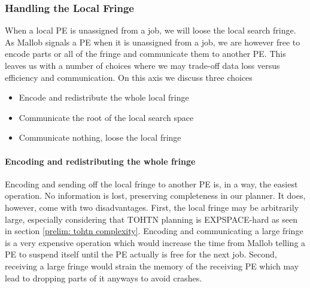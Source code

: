 \subsubsection{Handling the Local Fringe}
When a local PE is unassigned from a job, we will loose the local search fringe. As Mallob signals a PE when it is unassigned from a job, we are however free to encode parts or all of the fringe and communicate them to another PE. This leaves us with a number of choices where we may trade-off data loss versus efficiency and communication. On this axis we discuss three choices
\begin{itemize}
	\item Encode and redistribute the whole local fringe
	\item Communicate the root of the local search space
	\item Communicate nothing, loose the local fringe
\end{itemize}

\paragraph{Encoding and redistributing the whole fringe}
Encoding and sending off the local fringe to another PE is, in a way, the easiest operation. No information is lost, preserving completeness in our planner. It does, however, come with two disadvantages. First, the local fringe may be arbitrarily large, especially considering that TOHTN planning is EXPSPACE-hard as seen in section \ref{prelim: tohtn complexity}. Encoding and communicating a large fringe is a very expensive operation which would increase the time from Mallob telling a PE to suspend itself until the PE actually is free for the next job. Second, receiving a large fringe would strain the memory of the receiving PE which may lead to dropping parts of it anyways to avoid crashes.
\begin{comment}
- the most complete operation
- nothing is lost
- nodes higher up in the tree of PEs may be more strained now (depending on the communication pattern)
- a very expensive operation
- take care to delete the local fringe to avoid duplication!
\end{comment}

